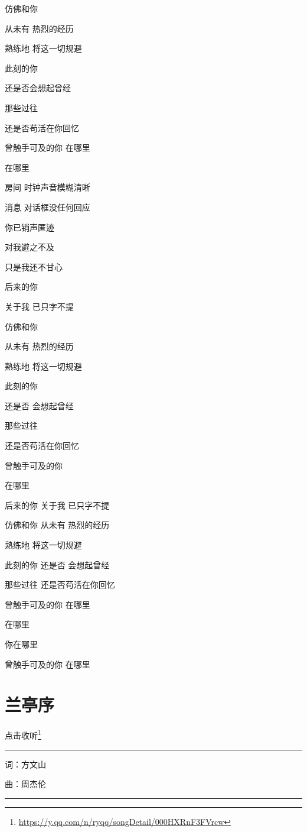 \documentclass[]{ctexbook}
\renewcommand{\href}[2]{#2\footnote{\url{#1}}}
\begin{document}
仿佛和你

从未有 热烈的经历

熟练地 将这一切规避

此刻的你

还是否会想起曾经

那些过往

还是否苟活在你回忆

曾触手可及的你 在哪里

在哪里

房间 时钟声音模糊清晰

消息 对话框没任何回应

你已销声匿迹

对我避之不及

只是我还不甘心

后来的你

关于我 已只字不提

仿佛和你

从未有 热烈的经历

熟练地 将这一切规避

此刻的你

还是否 会想起曾经

那些过往

还是否苟活在你回忆

曾触手可及的你

在哪里

后来的你 关于我 已只字不提

仿佛和你 从未有 热烈的经历

熟练地 将这一切规避

此刻的你 还是否 会想起曾经

那些过往 还是否苟活在你回忆

曾触手可及的你 在哪里

在哪里

你在哪里

曾触手可及的你 在哪里

\section*{兰亭序}\label{lantingxu}


\href{https://y.qq.com/n/ryqq/songDetail/000HXRnF3FVrcw}{点击收听}

\begin{center}\rule{0.5\linewidth}{0.5pt}\end{center}

词：方文山

曲：周杰伦

\begin{center}\rule{0.5\linewidth}{0.5pt}\end{center}
\end{document}

